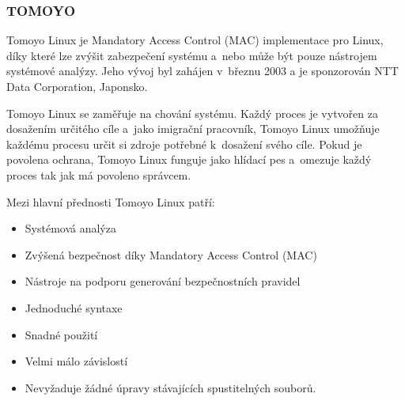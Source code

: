 \documentclass[a4paper,12pt]{article}
\begin{document}
\subsubsection{TOMOYO}

Tomoyo Linux je Mandatory Access Control (MAC) implementace pro Linux, díky které lze zvýšit zabezpečení systému a~nebo může být pouze nástrojem systémové analýzy. Jeho vývoj byl zahájen v~březnu 2003 a je sponzorován NTT Data Corporation, Japonsko.

Tomoyo Linux se zaměřuje na chování systému. Každý proces je vytvořen za dosažením určitého cíle a~jako imigrační pracovník, Tomoyo Linux umožňuje každému procesu určit si zdroje potřebné k~dosažení svého cíle. Pokud je povolena ochrana, Tomoyo Linux funguje jako hlídací pes a~omezuje každý proces tak jak má povoleno správcem.\cite{TOMOYOLinuxHOME}

Mezi hlavní přednosti Tomoyo Linux patří:
\begin{itemize}
 \item Systémová analýza
 \item Zvýšená bezpečnost díky Mandatory Access Control (MAC)
 \item Nástroje na podporu generování bezpečnostních pravidel
 \item Jednoduché syntaxe
 \item Snadné použití
 \item Velmi málo závislostí
 \item Nevyžaduje žádné úpravy stávajících spustitelných souborů.
\end{itemize}



\end{document}
